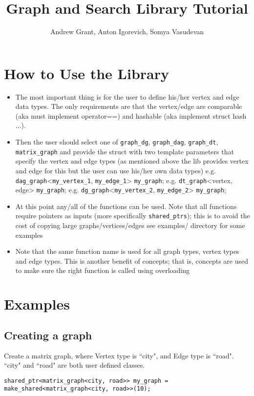 \documentclass{article}
\title{Graph and Search Library Tutorial}
\author{Andrew Grant,  Anton Igorevich, Somya Vasudevan}
\date{}
\begin{document}
\maketitle

\section{How to Use the Library}
\begin{itemize}
\item The most important thing is for the user to define his/her vertex and edge data types. The only requirements are that the vertex/edge are comparable (aka must implement operator==) and hashable (aka implement struct hash ...).
\item Then the user should select one of \texttt{graph\_dg}, \texttt{graph\_dag}, \texttt{graph\_dt}, \texttt{matrix\_graph} and provide the struct with two template parameters that specify the vertex and edge types (as mentioned above the lib provides vertex and edge for this but the user can use his/her own data types) e.g. \texttt{dag\_graph}<\texttt{my\_vertex\_1}, \texttt{my\_edge\_1}> \texttt{my\_graph}; e.g. \texttt{dt\_graph}<vertex, edge> \texttt{my\_graph}; e.g. \texttt{dg\_graph}<\texttt{my\_vertex\_2}, \texttt{my\_edge\_2}> \texttt{my\_graph};
\item At this point any/all of the functions can be used. Note that all functions require pointers as inputs (more specifically \texttt{shared\_ptrs}); this is to avoid the cost of copying large graphs/vertices/edges
see examples/ directory for some examples
\item Note that the same function name is used for all graph types, vertex types and edge types. This is another benefit of concepts; that is, concepts are used to make sure the right function is called using overloading
\end{itemize}

\section{Examples}

\subsection{Creating a graph}
Create a matrix graph, where Vertex type is ``city", and Edge type is ``road". ``city" and ``road" are both user defined classes.
\begin{lstlisting}
shared_ptr<matrix_graph<city, road>> my_graph = make_shared<matrix_graph<city, road>>(10);
\end{lstlisting}
\end{document}
